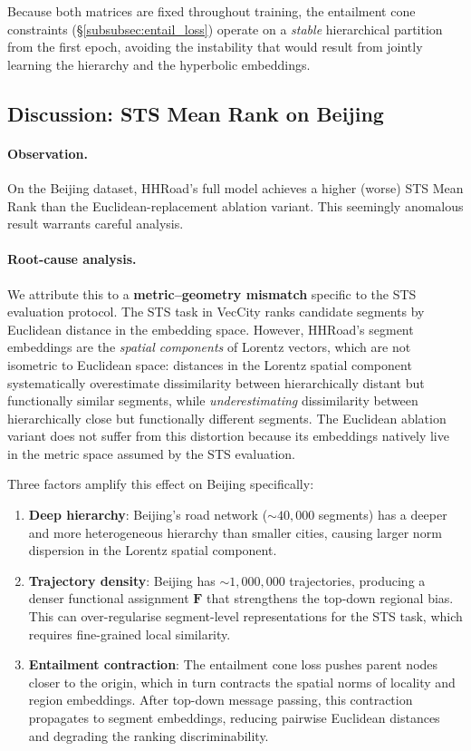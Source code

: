 \noindent
Because both matrices are fixed throughout training, the entailment cone constraints (\S\ref{subsubsec:entail_loss}) operate on a \emph{stable} hierarchical partition from the first epoch, avoiding the instability that would result from jointly learning the hierarchy and the hyperbolic embeddings.

\subsection{Discussion: STS Mean Rank on Beijing}\label{subsec:bj_sts_discussion}

\paragraph{Observation.}
On the Beijing dataset, HHRoad's full model achieves a higher (worse) STS Mean Rank than the Euclidean-replacement ablation variant.
This seemingly anomalous result warrants careful analysis.

\paragraph{Root-cause analysis.}
We attribute this to a \textbf{metric--geometry mismatch} specific to the STS evaluation protocol.
The STS task in VecCity ranks candidate segments by Euclidean distance in the embedding space.
However, HHRoad's segment embeddings are the \emph{spatial components} of Lorentz vectors, which are not isometric to Euclidean space:
distances in the Lorentz spatial component systematically overestimate dissimilarity between hierarchically distant but functionally similar segments,
while \emph{underestimating} dissimilarity between hierarchically close but functionally different segments.
The Euclidean ablation variant does not suffer from this distortion because its embeddings natively live in the metric space assumed by the STS evaluation.

Three factors amplify this effect on Beijing specifically:
\begin{enumerate}[leftmargin=*,itemsep=2pt]
  \item \textbf{Deep hierarchy}: Beijing's road network (${\sim}40{,}000$ segments) has a deeper and more heterogeneous hierarchy than smaller cities, causing larger norm dispersion in the Lorentz spatial component.
  \item \textbf{Trajectory density}: Beijing has ${\sim}1{,}000{,}000$ trajectories, producing a denser functional assignment $\mathbf{F}$ that strengthens the top-down regional bias. This can over-regularise segment-level representations for the STS task, which requires fine-grained local similarity.
  \item \textbf{Entailment contraction}: The entailment cone loss pushes parent nodes closer to the origin, which in turn contracts the spatial norms of locality and region embeddings. After top-down message passing, this contraction propagates to segment embeddings, reducing pairwise Euclidean distances and degrading the ranking discriminability.
\end{enumerate}

